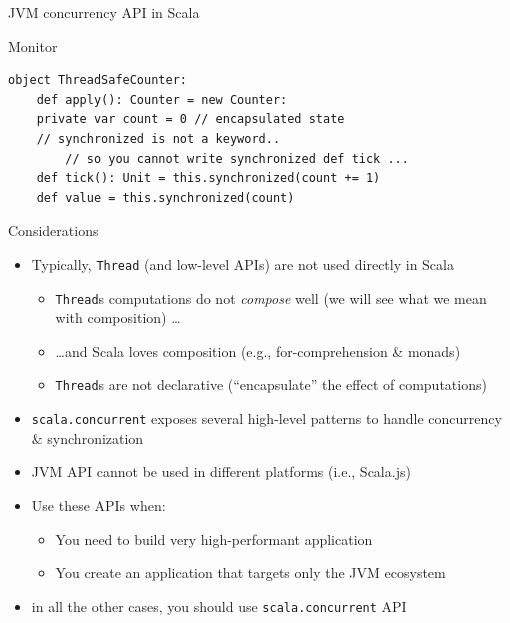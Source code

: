 \documentclass[presentation, 9pt]{beamer}\mode<presentation>{\usetheme{AMSBolognaFC}}
\begin{document}
\begin{frame}{JVM concurrency API in Scala}
\begin{itemize}
\begin{alertblock}{Monitor}
\begin{itemize}
\begin{tcolorbox}[left=0pt, top=0pt, bottom=0pt]
\begin{verbatim}
object ThreadSafeCounter:
	def apply(): Counter = new Counter:
    private var count = 0 // encapsulated state
    // synchronized is not a keyword.. 
		// so you cannot write synchronized def tick ...
    def tick(): Unit = this.synchronized(count += 1)
    def value = this.synchronized(count)
					\end{verbatim}
				\end{tcolorbox}
			\end{itemize}
		\end{alertblock}
	\end{itemize}
\end{frame}
\begin{frame}{Considerations}
	\begin{itemize}
		\item Typically, \texttt{Thread} (and low-level APIs) are not used directly in Scala
  	\begin{itemize}
			\item \texttt{Thread}s computations do not \emph{compose} well (we will see what we mean with composition) \dots
   		\item \dots and Scala loves composition (e.g., for-comprehension \& monads)
     \item \texttt{Thread}s are not declarative (``encapsulate'' the effect of computations)
		\end{itemize}
 		\item \texttt{scala.concurrent} exposes several high-level patterns to handle concurrency \& synchronization
 		\item JVM API cannot be used in different platforms (i.e., Scala.js)
   	\item Use these APIs when:
    \begin{itemize}
			\item You need to build very high-performant application
   		\item You create an application that targets only the JVM ecosystem 
		\end{itemize}
		\item in all the other cases, you should use \texttt{scala.concurrent} API
  \end{itemize}
\end{frame}
\end{document}
